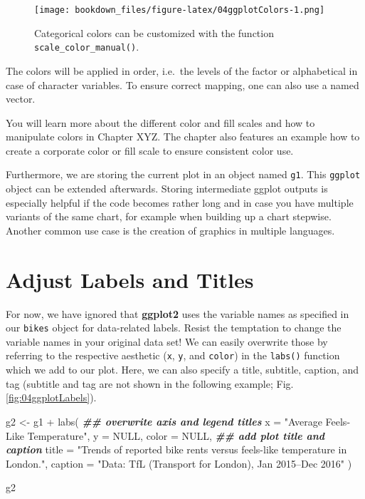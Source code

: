 \documentclass[
]{krantz}
\makeatletter
\newenvironment{Shaded}{\begin{snugshade}}{\end{snugshade}}
\newcommand{\AttributeTok}[1]{\textcolor[rgb]{0.61,0.61,0.61}{#1}}
\newcommand{\ConstantTok}[1]{\textcolor[rgb]{0,0,0}{#1}}
\newcommand{\DocumentationTok}[1]{\textcolor[rgb]{0.37,0.37,0.37}{\textbf{\textit{#1}}}}
\newcommand{\FunctionTok}[1]{\textcolor[rgb]{0,0,0}{#1}}
\newcommand{\NormalTok}[1]{#1}
\newcommand{\OtherTok}[1]{\textcolor[rgb]{0.37,0.37,0.37}{#1}}
\newcommand{\SpecialCharTok}[1]{\textcolor[rgb]{0,0,0}{#1}}
\newcommand{\StringTok}[1]{\textcolor[rgb]{0.5,0.5,0.5}{#1}}
\newenvironment{kframe}{%
\medskip{}
\setlength{\fboxsep}{.8em}
 \def\at@end@of@kframe{}%
 \ifinner\ifhmode%
  \def\at@end@of@kframe{\end{minipage}}%
  \begin{minipage}{\columnwidth}%
 \fi\fi%
 \def\FrameCommand##1{\hskip\@totalleftmargin \hskip-\fboxsep
 \colorbox{shadecolor}{##1}\hskip-\fboxsep
     \hskip-\linewidth \hskip-\@totalleftmargin \hskip\columnwidth}%
 \MakeFramed {\advance\hsize-\width
   \@totalleftmargin\z@ \linewidth\hsize
   \@setminipage}}%
 {\par\unskip\endMakeFramed%
 \at@end@of@kframe}
\renewenvironment{Shaded}{\begin{kframe}}{\end{kframe}}
\makeatother
\begin{document}
\begin{figure}
\centering
\texttt{[image: bookdown\_files/figure-latex/04ggplotColors-1.png]}
\caption{\label{fig:04ggplotColors}Categorical colors can be customized with the function \texttt{scale\_color\_manual()}.}
\end{figure}

The colors will be applied in order, i.e.~the levels of the factor or alphabetical in case of character variables. To ensure correct mapping, one can also use a named vector.

You will learn more about the different color and fill scales and how to manipulate colors in Chapter XYZ. The chapter also features an example how to create a corporate color or fill scale to ensure consistent color use.

Furthermore, we are storing the current plot in an object named \texttt{g1}. This \texttt{ggplot} object can be extended afterwards. Storing intermediate ggplot outputs is especially helpful if the code becomes rather long and in case you have multiple variants of the same chart, for example when building up a chart stepwise. Another common use case is the creation of graphics in multiple languages.

\hypertarget{label-adjustment}{%
\section{Adjust Labels and Titles}\label{label-adjustment}}

For now, we have ignored that \textbf{ggplot2} uses the variable names as specified in our \texttt{bikes} object for data-related labels. Resist the temptation to change the variable names in your original data set! We can easily overwrite those by referring to the respective aesthetic (\texttt{x}, \texttt{y}, and \texttt{color}) in the \texttt{labs()} function which we add to our plot. Here, we can also specify a title, subtitle, caption, and tag (subtitle and tag are not shown in the following example; Fig. \ref{fig:04ggplotLabels}).

\begin{Shaded}
\begin{Highlighting}[]
\NormalTok{g2 }\OtherTok{\textless{}{-}}\NormalTok{ g1 }\SpecialCharTok{+}
  \FunctionTok{labs}\NormalTok{(}
    \DocumentationTok{\#\# overwrite axis and legend titles}
    \AttributeTok{x =} \StringTok{"Average Feels{-}Like Temperature"}\NormalTok{, }\AttributeTok{y =} \ConstantTok{NULL}\NormalTok{, }\AttributeTok{color =} \ConstantTok{NULL}\NormalTok{,}
    \DocumentationTok{\#\# add plot title and caption}
    \AttributeTok{title =} \StringTok{"Trends of reported bike rents versus feels{-}like temperature in London."}\NormalTok{,}
    \AttributeTok{caption =} \StringTok{"Data: TfL (Transport for London), Jan 2015–Dec 2016"}
\NormalTok{  )}

\NormalTok{g2}
\end{Highlighting}
\end{Shaded}
\end{document}
